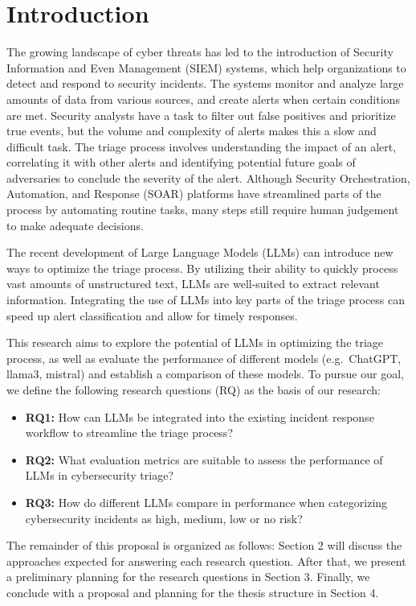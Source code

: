 \section{Introduction}
\label{sec:introduction}

The growing landscape of cyber threats has led to the introduction of Security Information and Even Management (SIEM)
systems, which help organizations to detect and respond to security incidents.
The systems monitor and analyze large amounts of data from various sources, and create alerts when certain conditions
are met. \citep{ibmsiem}
Security analysts have a task to filter out false positives and prioritize true events, but the volume and complexity
of alerts makes this a slow and difficult task.
The triage process involves understanding the impact of an alert, correlating it with other alerts and identifying
potential future goals of adversaries to conclude the severity of the alert.
Although Security Orchestration, Automation, and Response (SOAR) platforms have streamlined parts of the process by
automating routine tasks, many steps still require human judgement to make adequate decisions.
\citep{chuvakin2019triaging}


The recent development of Large Language Models (LLMs) can introduce new ways to optimize the triage process.
By utilizing their ability to quickly process vast amounts of unstructured text, LLMs are well-suited to extract
relevant information. \citep{chaudhary2024ai}
Integrating the use of LLMs into key parts of the triage process can speed up alert classification and allow for timely
responses.

This research aims to explore the potential of LLMs in optimizing the triage process, as well as evaluate the
performance of different models (e.g.\ ChatGPT, llama3, mistral) and establish a comparison of these models.
To pursue our goal, we define the following research questions (RQ) as the basis of our research:

\begin{itemize}
    \item \textbf{RQ1:} How can LLMs be integrated into the existing incident response workflow to streamline the triage process?
    \item \textbf{RQ2:} What evaluation metrics are suitable to assess the performance of LLMs in cybersecurity triage?
    \item \textbf{RQ3:} How do different LLMs compare in performance when categorizing cybersecurity incidents as high, medium, low or no risk?
\end{itemize}

The remainder of this proposal is organized as follows:
Section 2 will discuss the approaches expected for answering each research question.
After that, we present a preliminary planning for the research questions in Section 3.
Finally, we conclude with a proposal and planning for the thesis structure in Section 4.
